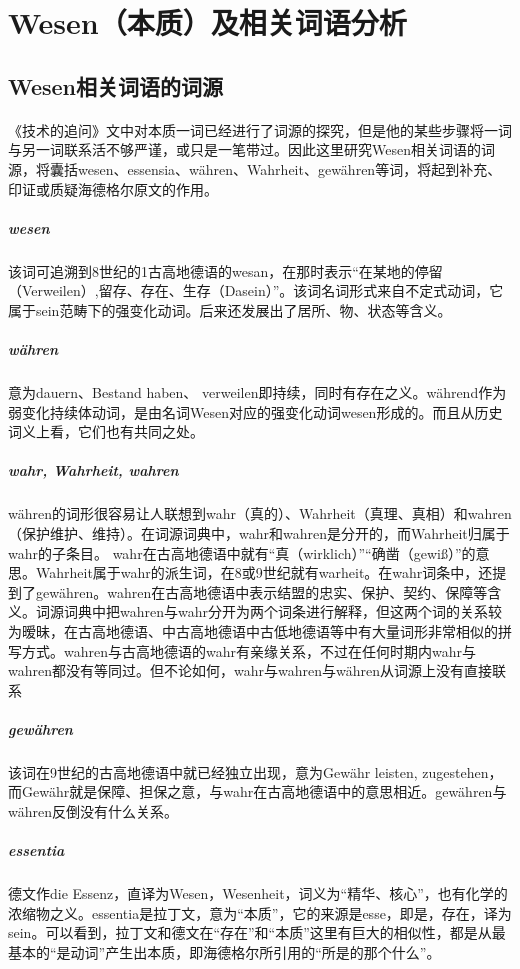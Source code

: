 \documentclass{article}
\begin{document}
\section{Wesen（本质）及相关词语分析}
	\subsection{Wesen相关词语的词源}
		\paragraph{}
		《技术的追问》文中对本质一词已经进行了词源的探究，但是他的某些步骤将一词与另一词联系活不够严谨，或只是一笔带过。因此这里研究Wesen相关词语的词源，将囊括wesen、essensia、währen、Wahrheit、gewähren等词，将起到补充、印证或质疑海德格尔原文的作用。
		\paragraph{}
			\subparagraph{wesen}
			该词可追溯到8世纪的1古高地德语的wesan，在那时表示“在某地的停留（Verweilen）,留存、存在、生存（Dasein）”。该词名词形式来自不定式动词，它属于sein范畴下的强变化动词。后来还发展出了居所、物、状态等含义。
			\subparagraph{währen}意为dauern、Bestand haben、 verweilen即持续，同时有存在之义。während作为弱变化持续体动词，是由名词Wesen对应的强变化动词wesen形成的。而且从历史词义上看，它们也有共同之处。
			\subparagraph{wahr, Wahrheit, wahren}
			währen的词形很容易让人联想到wahr（真的）、Wahrheit（真理、真相）和wahren（保护维护、维持）。在词源词典中，wahr和wahren是分开的，而Wahrheit归属于wahr的子条目。
wahr在古高地德语中就有“真（wirklich）”“确凿（gewiß）”的意思。Wahrheit属于wahr的派生词，在8或9世纪就有warheit。在wahr词条中，还提到了gewähren。wahren在古高地德语中表示结盟的忠实、保护、契约、保障等含义。词源词典中把wahren与wahr分开为两个词条进行解释，但这两个词的关系较为暧昧，在古高地德语、中古高地德语中古低地德语等中有大量词形非常相似的拼写方式。wahren与古高地德语的wahr有亲缘关系，不过在任何时期内wahr与wahren都没有等同过。但不论如何，wahr与wahren与währen从词源上没有直接联系
			\subparagraph{gewähren}
			该词在9世纪的古高地德语中就已经独立出现，意为Gewähr leisten, zugestehen，而Gewähr就是保障、担保之意，与wahr在古高地德语中的意思相近。gewähren与währen反倒没有什么关系。
			\subparagraph{essentia}
			德文作die Essenz，直译为Wesen，Wesenheit，词义为“精华、核心”，也有化学的浓缩物之义。essentia是拉丁文，意为“本质”，它的来源是esse，即是，存在，译为sein。可以看到，拉丁文和德文在“存在”和“本质”这里有巨大的相似性，都是从最基本的“是动词”产生出本质，即海德格尔所引用的“所是的那个什么”。
\end{document}
